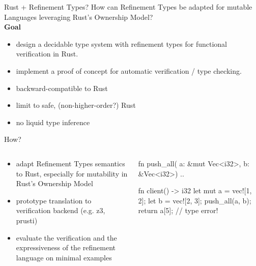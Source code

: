 \documentclass{sdqbeamer}
\begin{document}
\begin{frame}{Rust + Refinement Types?}
  How can Refinement Types be adapted for mutable Languages leveraging Rust's  Ownership Model?
  \vspace{1em}\\
  \textbf{Goal}
  \begin{itemize}
    \item design a decidable type system with refinement types for functional verification in Rust.
    \item implement a proof of concept for automatic verification / type checking.
    \item backward-compatible to Rust
    \item limit to safe, (non-higher-order?) Rust
    \item no liquid type inference
  \end{itemize}
\end{frame}

\begin{frame}[fragile=singleslide]{How?}
  \begin{columns}[T] %
    \begin{column}{.6\textwidth}
      \begin{itemize}
        \item adapt Refinement Types semantics to Rust, especially for mutability in Rust's Ownership Model
        \item prototype translation to verification backend (e.g. z3, prusti)
        \item evaluate the verification and the expressiveness of the refinement language on minimal examples
      \end{itemize}
    \end{column}%
    \hfill%
      \begin{column}{.38\textwidth}
        \begin{rustcode}
          fn push_all(
              a: &mut Vec<i32>, 
              b: &Vec<i32>) {
                ..
          }

          fn client() -> i32 {
            let mut a = vec![1, 2];
            let b = vec![2, 3];
            push_all(a, b);
            return a[5]; // type error!
          }
        \end{rustcode}
      \end{column}%
    \end{columns}
  
  
\end{frame}
\end{document}
